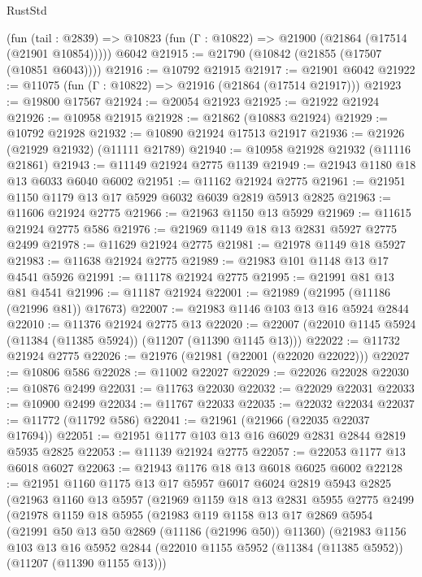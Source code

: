 \begin{lexlean}{RustStd}
\begin{coremodule}
    (fun (tail : @2839) => @10823 (fun (Γ : @10822) => @21900 (@21864 (@17514 (@21901 @10854)))))
    @6042
@21915 := @21790 (@10842 (@21855 (@17507 (@10851 @6043))))
@21916 := @10792 @21915
@21917 := @21901 @6042
@21922 := @11075 (fun (Γ : @10822) => @21916 (@21864 (@17514 @21917)))
@21923 := @19800 @17567
@21924 := @20054 @21923
@21925 := @21922 @21924
@21926 := @10958 @21915
@21928 := @21862 (@10883 @21924)
@21929 := @10792 @21928
@21932 := @10890 @21924 @17513 @21917
@21936 := @21926 (@21929 @21932) (@11111 @21789)
@21940 := @10958 @21928 @21932 (@11116 @21861)
@21943 := @11149 @21924 @2775 @1139
@21949 := @21943 @1180 @18 @13 @6033 @6040 @6002
@21951 := @11162 @21924 @2775
@21961 := @21951 @1150 @1179 @13 @17 @5929 @6032 @6039 @2819 @5913 @2825
@21963 := @11606 @21924 @2775
@21966 := @21963 @1150 @13 @5929
@21969 := @11615 @21924 @2775 @586
@21976 := @21969 @1149 @18 @13 @2831 @5927 @2775 @2499
@21978 := @11629 @21924 @2775
@21981 := @21978 @1149 @18 @5927
@21983 := @11638 @21924 @2775
@21989 := @21983 @101 @1148 @13 @17 @4541 @5926
@21991 := @11178 @21924 @2775
@21995 := @21991 @81 @13 @81 @4541
@21996 := @11187 @21924
@22001 := @21989 (@21995 (@11186 (@21996 @81)) @17673)
@22007 := @21983 @1146 @103 @13 @16 @5924 @2844
@22010 := @11376 @21924 @2775 @13
@22020 := @22007 (@22010 @1145 @5924 (@11384 (@11385 @5924)) (@11207 (@11390 @1145 @13)))
@22022 := @11732 @21924 @2775
@22026 := @21976 (@21981 (@22001 (@22020 @22022)))
@22027 := @10806 @586
@22028 := @11002 @22027
@22029 := @22026 @22028
@22030 := @10876 @2499
@22031 := @11763 @22030
@22032 := @22029 @22031
@22033 := @10900 @2499
@22034 := @11767 @22033
@22035 := @22032 @22034
@22037 := @11772 (@11792 @586)
@22041 := @21961 (@21966 (@22035 @22037 @17694))
@22051 := @21951 @1177 @103 @13 @16 @6029 @2831 @2844 @2819 @5935 @2825
@22053 := @11139 @21924 @2775
@22057 := @22053 @1177 @13 @6018 @6027
@22063 := @21943 @1176 @18 @13 @6018 @6025 @6002
@22128 := @21951
    @1160
    @1175
    @13
    @17
    @5957
    @6017
    @6024
    @2819
    @5943
    @2825
    (@21963
      @1160
      @13
      @5957
      (@21969
        @1159
        @18
        @13
        @2831
        @5955
        @2775
        @2499
        (@21978
          @1159
          @18
          @5955
          (@21983
            @119
            @1158
            @13
            @17
            @2869
            @5954
            (@21991 @50 @13 @50 @2869 (@11186 (@21996 @50)) @11360)
            (@21983
              @1156
              @103
              @13
              @16
              @5952
              @2844
              (@22010 @1155 @5952 (@11384 (@11385 @5952)) (@11207 (@11390 @1155 @13)))

\end{coremodule}
\end{lexlean}
